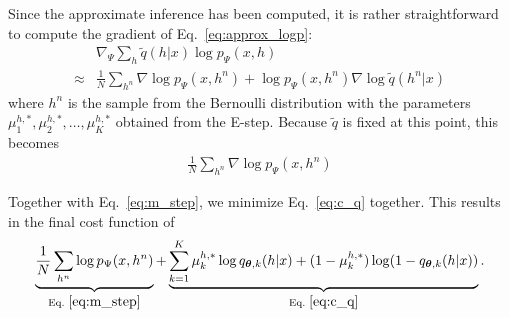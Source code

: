 \documentclass{article}
\newcommand{\vects}[1]{\boldsymbol{#1}}
\newcommand{\TT}[0]{\vects{\theta}}
\begin{document}
Since the approximate inference has been computed, it is rather straightforward
to compute the gradient of Eq.~\eqref{eq:approx_logp}:
\begin{align*}
    &\nabla_{\Psi} \sum_h \tilde{q}(h|x) \log p_{\Psi}(x,h) \\
    \approx&
    \frac{1}{N} \sum_{h^n} \nabla \log p_{\Psi}(x,h^n) 
    + \log p_{\Psi}(x,h^n) \nabla \log \tilde{q}(h^n|x) 
\end{align*}
where $h^n$ is the sample from the Bernoulli distribution with the parameters
$\mu^{h,*}_1, \mu^{h,*}_2, \ldots, \mu^{h,*}_K$ obtained from the E-step.
Because $\tilde{q}$ is fixed at this point, this becomes
\begin{align}
    \label{eq:m_step}
    \frac{1}{N} \sum_{h^n} \nabla \log p_{\Psi}(x,h^n) 
\end{align}

Together with Eq.~\eqref{eq:m_step}, we minimize Eq.~\eqref{eq:c_q} together. This
results in the final cost function of
\begin{align*}
    \underbrace{\frac{1}{N} \sum_{h^n} \log p_{\Psi}(x,h^n)}_{\text{Eq.~}\eqref{eq:m_step}} + 
    \underbrace{\sum_{k=1}^K \mu^{h,*}_k\log q_{\TT,k}(h|x) + 
    (1 - \mu^{h,*}_k)\log (1 - q_{\TT,k}(h|x))}_{\text{Eq.~}\eqref{eq:c_q}}.
\end{align*}













%
%
\end{document}
